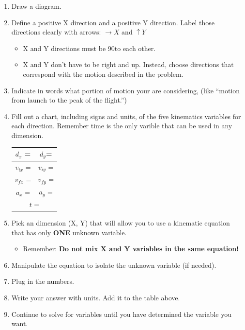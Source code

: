 \documentclass[letterpaper, 12pt]{article}
\begin{document}
		\begin{enumerate}
	\item Draw a diagram.
	\item Define a positive X direction and a positive Y direction.  Label those directions clearly with arrows: $\longrightarrow X $ and $\uparrow Y$
	\begin{itemize}
		\item X and Y directions must be 90\degree to each other.
		\item X and Y don't have to be right and up.  Instead, choose directions that correspond with the motion described in the problem. 
		
	\end{itemize}
	\item Indicate in words what portion of motion your are considering, (like ``motion from launch to the peak of the flight.”)
	\item Fill out a chart, including signs and units, of the five kinematics variables for each direction.  Remember time is the only varible that can be used in any dimension.
	\begin{center}
		\begin{tabular} {| c | c | }
			\hline
			$d_x$ = \hspace{0.4in}    & $d_y $= \hspace{0.4in} \\
			\hline
			$v_{ix}$  = \hspace{0.4in}  &$v_{iy}$  = \hspace{0.4in} \\
			\hline
			$v_{fx}$  = \hspace{0.4in}  &$v_{fy}$  = \hspace{0.4in} \\
			\hline
			$a_{x}$  = \hspace{0.4in}  &$a_{y}$  = \hspace{0.4in} \\
			\hline 
		 	 \multicolumn{2}{|c|}{	$t$  = \hspace{0.4in} }  \\
			\hline
		\end{tabular} 
	\end{center}
	\item Pick an dimension (X, Y) that will allow you to use a kinematic equation that has only \textbf{ONE} unknown variable.  
		\begin{itemize}
			\item Remember: \textbf{Do not mix X and Y variables in the same equation!}
		\end{itemize}
	\item Manipulate the equation to isolate the unknown variable (if needed).
	\item Plug in the numbers.
	\item Write your answer with units. Add it to the table above.
	\item Continue to solve for variables until you have determined the variable you want. 
	
\end{enumerate}
\end{document}
